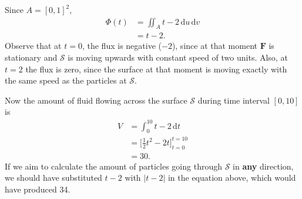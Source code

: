 \documentclass[12pt]{article}
\newcommand{\F}{\mathbf{F}}
\newcommand{\ddt}{\,\mathrm{d}t}
\newcommand{\ddu}{\, \mathrm{d}u}
\newcommand{\ddv}{\, \mathrm{d}v}
\begin{document}
Since $A = \left[ 0, 1 \right]^2$,
\begin{align*}
\Phi(t) &= \iint_A t - 2 \ddu \ddv \\
          &= t - 2.
\end{align*}
Observe that at $t = 0$, the flux is negative ($-2$), since at that moment $\F$ is stationary and $\mathscr{S}$ is moving upwards with constant speed of two units. Also, at $t = 2$ the flux is zero, since the surface at that moment is moving exactly with the same speed as the particles at $\mathscr{S}$.

Now the amount of fluid flowing across the surface $\mathscr{S}$ during time interval $\left[  0, 10 \right]$ is
\begin{align*}
V &= \int_0^{10} t - 2 \ddt  \\
   &= \Big[ \frac{1}{2} t^2 - 2t \Big]_{t = 0}^{t = 10} \\
   &= 30.
\end{align*} 
If we aim to calculate the amount of particles going through $\mathscr{S}$ in \textbf{any} direction, we should have substituted $t - 2$ with $|t - 2|$ in the equation above, which would have produced 34.
\end{document}
